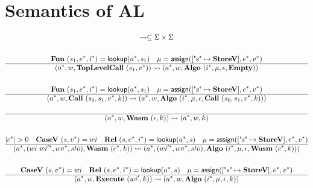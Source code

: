 \section{Semantics of AL}
\label{semantics}


\begin{gather*}
\leadsto \subseteq \Sigma \times \Sigma \\
%
\newline \\
  \fun ~ (s_1, \seq e, \seq i) = \lookup(\seq{a}, s_1) \quad \mu = \assign([\text{"s"} \mapsto \storev], \seq e, \seq v) \\
  \hline
  (\seq{a}, w, \toplevelcall ~ (s_1, \seq v)) \leadsto (\seq{a}, w, \algo ~ (\seq i, \mu, \epsilon, \mt)) \\
%
\newline \\
  \fun ~ (s_1, \seq e, \seq i) = \lookup(\seq{a}, s_1) \quad \mu = \assign([\text{"s"} \mapsto \storev], \seq e, \seq v) \\
  \hline
  (\seq{a}, w, \call ~ (s_0, s_1, \seq v, k)) \leadsto (\seq{a}, w, \algo ~ (\seq i, \mu, \epsilon, \call ~ (s_0, s_1, \seq v, k))) \\
%
\newline \\
  \hline
  (\seq{a}, w, \wasm ~ (\epsilon, k)) \leadsto (\seq{a}, w, k) \\
%
\newline \\
  |\seq c| > 0 \quad
  \casev ~ (s, \seq v) = wi \quad
  \rel ~ (s, \seq e, \seq i) = \lookup(\seq{a}, s) \quad
  \mu = \assign([\text{"s"} \mapsto \storev], \seq e, \seq v) \\
  \hline
  (\seq{a}, (wi ~ \seq{wi'}, \seq{wv}, sto), \wasm ~ (\seq c, k))
  \leadsto
  (\seq{a}, (\seq{wi'}, \seq{wv}, sto), \algo ~ (\seq i, \mu, \epsilon, \wasm ~ (\seq c, k))) \\
%
\newline \\
  \casev ~ (s, \seq v) = wi \quad
  \rel ~ (s, \seq e, \seq i) = \lookup(\seq{a}, s) \quad
  \mu = \assign([\text{"s"} \mapsto \storev], \seq e, \seq v) \\
  \hline
  (\seq{a}, w, \exe ~ (wi', k)) \leadsto (\seq{a}, w, \algo ~ (\seq i, \mu, \epsilon, k)) \\
%
\newline \\

\end{gather*}
